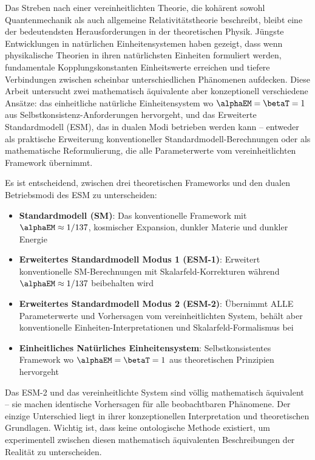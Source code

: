 	Das Streben nach einer vereinheitlichten Theorie, die kohärent sowohl Quantenmechanik als auch allgemeine Relativitätstheorie beschreibt, bleibt eine der bedeutendsten Herausforderungen in der theoretischen Physik. Jüngste Entwicklungen in natürlichen Einheitensystemen haben gezeigt, dass wenn physikalische Theorien in ihren natürlichsten Einheiten formuliert werden, fundamentale Kopplungskonstanten Einheitswerte erreichen und tiefere Verbindungen zwischen scheinbar unterschiedlichen Phänomenen aufdecken. Diese Arbeit untersucht zwei mathematisch äquivalente aber konzeptionell verschiedene Ansätze: das einheitliche natürliche Einheitensystem wo $\alphaEM = \betaT = 1$ aus Selbstkonsistenz-Anforderungen hervorgeht, und das Erweiterte Standardmodell (ESM), das in dualen Modi betrieben werden kann – entweder als praktische Erweiterung konventioneller Standardmodell-Berechnungen oder als mathematische Reformulierung, die alle Parameterwerte vom vereinheitlichten Framework übernimmt.
	
	Es ist entscheidend, zwischen drei theoretischen Frameworks und den dualen Betriebsmodi des ESM zu unterscheiden:
	
	\begin{itemize}
		\item \textbf{Standardmodell (SM)}: Das konventionelle Framework mit $\alphaEM \approx 1/137$, kosmischer Expansion, dunkler Materie und dunkler Energie
		\item \textbf{Erweitertes Standardmodell Modus 1 (ESM-1)}: Erweitert konventionelle SM-Berechnungen mit Skalarfeld-Korrekturen während $\alphaEM \approx 1/137$ beibehalten wird
		\item \textbf{Erweitertes Standardmodell Modus 2 (ESM-2)}: Übernimmt ALLE Parameterwerte und Vorhersagen vom vereinheitlichten System, behält aber konventionelle Einheiten-Interpretationen und Skalarfeld-Formalismus bei
		\item \textbf{Einheitliches Natürliches Einheitensystem}: Selbstkonsistentes Framework wo $\alphaEM = \betaT = 1$ aus theoretischen Prinzipien hervorgeht
	\end{itemize}
	
	Das ESM-2 und das vereinheitlichte System sind völlig mathematisch äquivalent – sie machen identische Vorhersagen für alle beobachtbaren Phänomene. Der einzige Unterschied liegt in ihrer konzeptionellen Interpretation und theoretischen Grundlagen. Wichtig ist, dass keine ontologische Methode existiert, um experimentell zwischen diesen mathematisch äquivalenten Beschreibungen der Realität zu unterscheiden.
	
